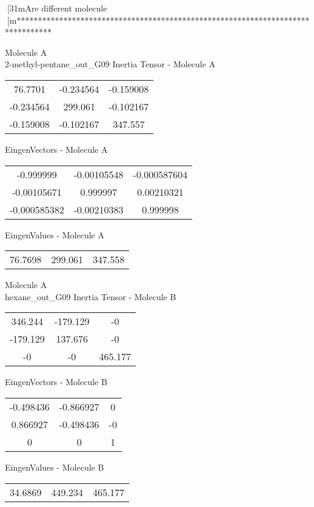 [31mAre different molecule
[m********************************************************************************
\newpage
\begin{multicols}{2}
\begin{center}
Molecule A \\ 
2-methyl-pentane_out_G09
Inertia Tensor - Molecule A \\
\vtab
\begin{tabular}{|c c c|}
76.7701	 & 	-0.234564	 & 	-0.159008	 \\
-0.234564	 & 	299.061	 & 	-0.102167	 \\
-0.159008	 & 	-0.102167	 & 	347.557
\end{tabular}

\vtab
 EingenVectors - Molecule A     \\
\vtab
\begin{tabular}{|c c c|}
-0.999999	 & 	-0.00105548	 & 	-0.000587604	 \\
-0.00105671	 & 	0.999997	 & 	0.00210321	 \\
-0.000585382	 & 	-0.00210383	 & 	0.999998
\end{tabular}

\vtab
 EingenValues - Molecule A     \\
\vtab
\begin{tabular}{|c c c|}
76.7698	 & 	299.061	 & 	347.558
\end{tabular}
\columnbreak
Molecule A \\ 
hexane_out_G09
Inertia Tensor - Molecule B \\
\vtab
\begin{tabular}{|c c c|}
346.244	 & 	-179.129	 & 	-0	 \\
-179.129	 & 	137.676	 & 	-0	 \\
-0	 & 	-0	 & 	465.177
\end{tabular}

\vtab
 EingenVectors - Molecule B     \\
\vtab
\begin{tabular}{|c c c|}
-0.498436	 & 	-0.866927	 & 	0	 \\
0.866927	 & 	-0.498436	 & 	-0	 \\
0	 & 	0	 & 	1
\end{tabular}

\vtab
 EingenValues - Molecule B     \\
\vtab
\begin{tabular}{|c c c|}
34.6869	 & 	449.234	 & 	465.177
\end{tabular}
\end{center}
\end{multicols}
